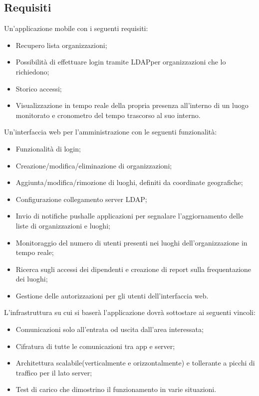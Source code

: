\subsection{Requisiti}
Un'applicazione mobile con i seguenti requisiti:
\begin{itemize}
	\item Recupero lista organizzazioni;
	\item Possibilità di effettuare login tramite LDAP\glo per organizzazioni che lo richiedono;
	\item Storico accessi;
	\item Visualizzazione in tempo reale della propria presenza all'interno di un luogo monitorato e cronometro del tempo trascorso al suo interno.
\end{itemize}
Un'interfaccia web per l'amministrazione con le seguenti funzionalità:
\begin{itemize}
	\item Funzionalità di login;
	\item Creazione/modifica/eliminazione di organizzazioni;
	\item Aggiunta/modifica/rimozione di luoghi, definiti da coordinate geografiche;
	\item Configurazione collegamento server LDAP\glo;
	\item Invio di notifiche push\glosp alle applicazioni per segnalare l'aggiornamento delle liste di organizzazioni e luoghi;
	\item Monitoraggio del numero di utenti presenti nei luoghi dell'organizzazione in tempo reale;
	\item Ricerca sugli accessi dei dipendenti e creazione di report sulla frequentazione dei luoghi;
	\item Gestione delle autorizzazioni per gli utenti dell'interfaccia web.
\end{itemize}
L'infrastruttura su cui si baserà l'applicazione dovrà sottostare ai seguenti vincoli:
\begin{itemize}
	\item Comunicazioni solo all'entrata od uscita dall'area interessata;
	\item Cifratura di tutte le comunicazioni tra app e server;
	\item Architettura scalabile\glosp (verticalmente e orizzontalmente) e tollerante a picchi di traffico per il lato server;
	\item Test di carico che dimostrino il funzionamento in varie situazioni.
\end{itemize}

